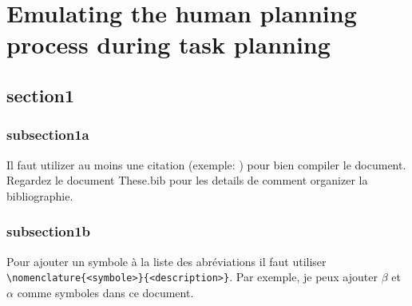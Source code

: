 \documentclass[a4paper,11pt,twoside]{StyleThese}
\begin{document}
\setcounter{chapter}{3} %
\dominitoc
\faketableofcontents
\fi

\chapter{Emulating the human planning process during task planning}
\minitoc

\section{section1}
\subsection{subsection1a}

Il faut utilizer au moins une citation (exemple: \cite{goossens93}) pour bien
compiler le document. Regardez le document These.bib pour les details de
comment organizer la bibliographie.

\subsection{subsection1b}

Pour ajouter un symbole à la liste des abréviations il faut utiliser
\verb|\nomenclature{<symbole>}{<description>}|. Par exemple, je peux ajouter
$\beta$ et
$\alpha$ comme
symboles dans ce document.

\ifdefined{}
\else


\end{document}
